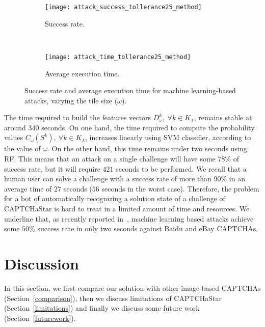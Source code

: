\documentclass[conference]{IEEEtran}
\begin{document}
\begin{figure}[ht!]
\centering
\begin{subfigure}{.45\textwidth}
\texttt{[image: attack\_success\_tollerance25\_method]}\caption{Success rate.}
\label{fig:successRateML}
\end{subfigure}
\\
\begin{subfigure}{.45\textwidth}
\texttt{[image: attack\_time\_tollerance25\_method]}\caption{Average execution time.}
\label{fig:timeML}
\end{subfigure}
\vspace{-0.cm}
\caption{Success rate and average execution time for machine learning-based attacks, varying the tile size ($\omega$).}
\label{fig:MLSuccess}
\end{figure}

The time required to build the features vectors $D_{\omega}^{k},\ \forall k\in K_{\lambda}$, remains stable at around $340$ seconds.  
On one hand, the time required to compute the probability values $C_{\omega}(S^{k}),\ \forall k\in K_{\lambda}$, increases linearly using SVM classifier, according to the value of $\omega$.
On the other hand, this time remains under two seconds using RF. This means that an attack on a single challenge will have some $78\%$ of success rate, but it will require $421$ seconds to be performed.
We recall that a human user can solve a challenge with a success rate of more than $90\%$ in an average time of $27$ seconds ($56$ seconds in the worst case).
Therefore, the problem for a bot of automatically recognizing a solution state of a challenge of CAPTCHaStar is hard to treat in a limited amount of time and resources.
We underline that, as recently reported in~\cite{bursztein2014end}, machine learning based attacks achieve some $50\%$ success rate in only two seconds against Baidu and eBay CAPTCHAs.
\newcommand*\rot{\rotatebox{90}}
\newcommand*\OK{\ding{51}}
\newcommand*\NO{\ding{55}}


\section{Discussion}
\label{discussion}
In this section, we first compare our solution with other image-based CAPTCHAs (Section~\ref{comparison}), then we discuss limitations of CAPTCHaStar (Section~\ref{limitations}) and finally we discuss some future work (Section~\ref{futurework}). 
\end{document}
